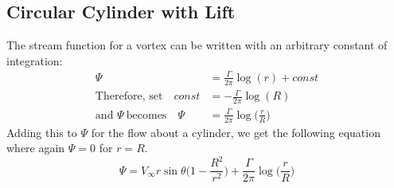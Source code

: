 \documentclass[draft=false, titlepage]{article}
\begin{document}
 \subsection{Circular Cylinder with Lift}
 The stream function for a vortex can be written with an arbitrary constant of integration:
 \begin{align*}
     \Psi &=\frac{\Gamma}{2\pi} \log(r) + const\\
     \text{Therefore, set} \quad const &= -\frac{\Gamma}{2\pi}\log (R)\\
     \text{and } \Psi\ \text{becomes} \quad \Psi &= \frac{\Gamma}{2\pi} \log\big(\frac{r}{R}\big)
 \end{align*}
 Adding this to $\Psi$ for the flow about a cylinder, we get the following equation where again $\Psi = 0$ for $r = R$.
 \begin{equation*}
     \Psi = V_\infty r \sin\theta \big(1-\frac{R^2}{r^2}\big) + \frac{\Gamma}{2\pi}\log\big(\frac{r}{R}\big)
 \end{equation*}
 
\end{document}
